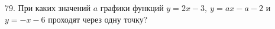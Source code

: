 79. При каких значений $a$ графики функций $y=2x-3,\ y=ax-a-2$ и $y=-x-6$ проходят через одну точку?\\
